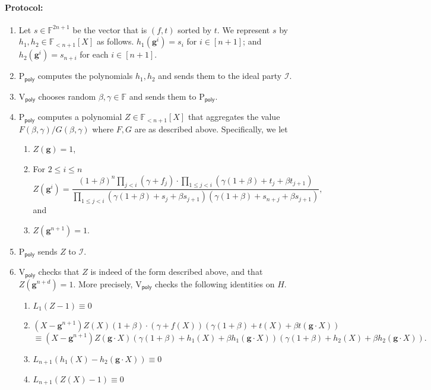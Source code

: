 \documentclass[11pt]{article} %
\newcommand{\F}{\ensuremath{\mathbb F}\xspace}
\newcommand{\dom}{\ensuremath{H}\xspace}
\newcommand{\prvpoly}{\ensuremath{\mathrm{P_{\mathsf{poly}}}}\xspace}
\newcommand{\verpoly}{\ensuremath{\mathrm{V_{\mathsf{poly}}}}\xspace}
\newcommand{\ideal}{\ensuremath{\mathcal{I}}\xspace}
\newcommand{\hgen}{\ensuremath{\mathbf{g}}\xspace}
\newcommand{\cosetgen}{\ensuremath{\mathbf{\kappa}}\xspace}
\newcommand{\polysofdeg}[1]{\ensuremath{\F_{< #1}[X]}\xspace}
\newcommand{\sone}{\ensuremath{ h_1}\xspace}
\newcommand{\stwo}{\ensuremath{ h_{2}}\xspace}
\begin{document}
\paragraph{Protocol:}
\begin{enumerate}
 \item Let $s\in \F^{2n+1}$ be the vector that is $(f,t)$ sorted by $t$. We represent $s$ by $\sone,\stwo \in \polysofdeg{n+1}$ as follows.
$\sone (\hgen^i) = s_i$ for $i\in [n+1]$; and $\stwo(\hgen ^i)= s_{n+i}$ for each $i\in [n+1]$.
 
 \item \prvpoly computes the polynomials $\sone,\stwo$ and sends them to the ideal party \ideal.
 \item \verpoly chooses random $\beta,\gamma \in \F$ and sends them to \prvpoly.
 \item \prvpoly computes a polynomial $Z\in \polysofdeg{n+1}$ that aggregates the value $F(\beta,\gamma)/G(\beta,\gamma)$ where $F,G$ are as described above. Specifically, we let
\begin{enumerate}
 \item  $Z(\hgen) = 1$,
\item For $2\leq i \leq n$
\[Z(\hgen^{i})= \frac{(1+\beta)^n \prod_{j < i} (\gamma + f_j)\cdot \prod_{1\leq j < i} (\gamma(1+\beta)+ t_j + \beta t_{j+1})}{\prod_{1\leq j <i} (\gamma(1+\beta)+ s_j + \beta s_{j+1})(\gamma(1+\beta)+ s_{n+j} + \beta s_{j+1})},\]
 and
\item $Z(\hgen^{n+1})=1$.
\end{enumerate}
 \item \prvpoly sends $Z$ to \ideal.
 \item \verpoly checks that $Z$ is indeed of the form described above, and that $Z(\hgen^{n+d})=1$. More precisely, \verpoly checks the following identities on $H$.
 \begin{enumerate}
  \item $L_1(Z-1)\equiv 0$
  \item 
  \[(X-\hgen^{n+1})Z(X)(1+\beta)\cdot (\gamma + f(X))(\gamma(1+\beta)+ t(X)+\beta t(\hgen \cdot X) )\]
  \[\equiv (X-\hgen^{n+1}) Z(\hgen\cdot X)(\gamma(1+\beta)+ \sone(X)+\beta \sone(\hgen \cdot X))(\gamma(1+\beta)+ \stwo(X)+\beta \stwo(\hgen \cdot X)).\]
  \item\label{check:consist} $L_{n+1}(\sone(X)-\stwo(\hgen \cdot X))\equiv 0$
  \item $L_{n+1}(Z(X)-1)\equiv 0$
 

\end{enumerate}
\end{enumerate}
\end{document}
